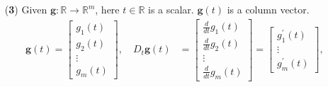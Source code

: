 \documentclass[12pt,thmsa]{article}
\begin{document}
\begin{itemize}
	\item[({\bf{3}})] Given \(\boldsymbol{g}: \mathbb{R} \rightarrow \mathbb{R}^m \), here \(t \in \mathbb{R} \) is a scalar. \(\boldsymbol{g}(t)\) is a column vector.
	\[
	\begin{aligned}
		\boldsymbol{g}(t) =
		\left[
		\begin{array}{c}
			g_{1}(t) \\
			g_{2}(t) \\
			\vdots \\
			g_{m}(t)
		\end{array}
		\right], \quad
		D_{t} \boldsymbol{g}(t) & =\left[
		\begin{aligned}
			\frac{d}{d t}g_{1}(t) \\
			\frac{d}{d t}g_{2}(t) \\
			\vdots \qquad \\
			\frac{d}{d t}g_{m}(t)
		\end{aligned}
		\right] =\left[\begin{array}{c}
			g_{1}^{\prime}(t) \\
			\vdots \\
			g_{m}^{\prime}(t)
		\end{array}\right],  \\
	\end{aligned}
	\]



\end{itemize}
\end{document}
